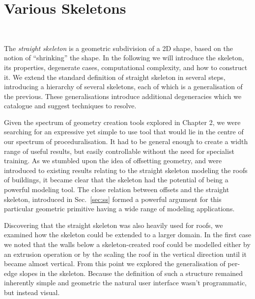 \graphicspath{{12-skeleton/images/}}

\chapter{Various Skeletons}
~\label{c:various_skels}


The \emph{straight skeleton} is a geometric subdivision of a 2D shape, based on the notion of ``shrinking'' the shape. In the following we will introduce the skeleton, its properties, degenerate cases, computational complexity, and how to construct it. We extend the standard definition of straight skeleton in several steps, introducing a hierarchy of several skeletons, each of which is a generalisation of the previous. These generalisations introduce additional degeneracies which we catalogue and suggest techniques to resolve. 



Given the spectrum of geometry creation tools explored in Chapter 2, we were searching for an expressive yet simple to use tool that would lie in the centre of our spectrum of proceduralisation. It had to be general enough to create a width range of useful results, but easily controllable without the need for specialist training. As we stumbled upon the idea of offsetting geometry, and were introduced to existing results\cite{Havemann:2005:GMM} relating to the straight skeleton modeling the roofs of buildings, it became clear that the skeleton had the potential of being a powerful modeling tool. The close relation between offsets and the straight skeleton, introduced in Sec.~\ref{sec:ss} formed a powerful argument for this particular geometric primitive having a wide range of modeling applications.

Discovering that the straight skeleton was also heavily used for roofs, we examined how the skeleton could be extended to a larger domain. In the first case we noted that the walls below a skeleton-created roof could be modelled either by an extrusion operation or by the scaling the roof in the vertical direction until it became almost vertical. From this point we explored the generalisation of per-edge slopes in the skeleton. Because the definition of such a structure remained inherently simple and geometric the natural user interface wasn't programmatic, but instead visual.  


